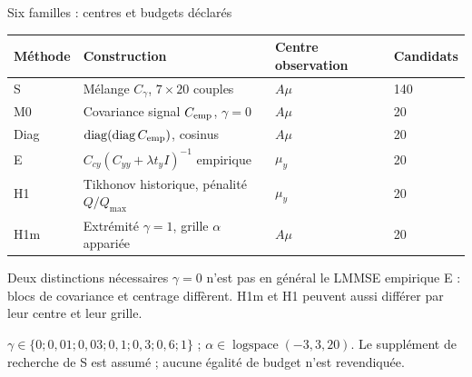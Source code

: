 \documentclass[aspectratio=169,10pt]{beamer}
\begin{document}
\begin{frame}{Six familles : centres et budgets déclarés}
\small
\begin{center}
\begin{tabular}{llll}
\toprule
Méthode & Construction & Centre observation & Candidats\\
\midrule
S & Mélange $C_\gamma$, $7\times20$ couples & $A\mu$ & 140\\
M0 & Covariance signal $C_{\rm emp}$, $\gamma=0$ & $A\mu$ & 20\\
Diag & $\operatorname{diag}(\operatorname{diag}C_{\rm emp})$, cosinus & $A\mu$ & 20\\
E & $C_{cy}(C_{yy}+\lambda t_yI)^{-1}$ empirique & $\mu_y$ & 20\\
H1 & Tikhonov historique, pénalité $Q/Q_{\max}$ & $\mu_y$ & 20\\
H1m & Extrémité $\gamma=1$, grille $\alpha$ appariée & $A\mu$ & 20\\
\bottomrule
\end{tabular}
\end{center}
\par\vspace{2mm}
\begin{block}{Deux distinctions nécessaires}
$\gamma=0$ n'est pas en général le LMMSE empirique E : blocs de covariance et centrage diffèrent. H1m et H1 peuvent aussi différer par leur centre et leur grille.
\end{block}
\scriptsize $\gamma\in\{0;0,01;0,03;0,1;0,3;0,6;1\}$ ; $\alpha\in\operatorname{logspace}(-3,3,20)$. Le supplément de recherche de S est assumé ; aucune égalité de budget n'est revendiquée.
\end{frame}
\end{document}
